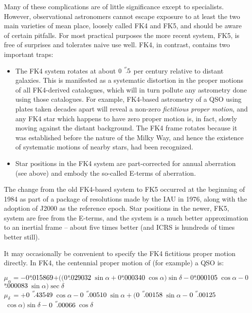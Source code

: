 \documentclass[11pt,twoside,nolof]{starlink}
\providecommand{\arcsec}[2] {\arcseci{#1}$\hspace{-0.4em}.#2$}
\providecommand{\arcseci}[1] {$#1\hspace{-0.05em}$\raisebox{-0.5ex}
                         {$^{'\hspace{-0.1em}'}$}}
\providecommand{\tseci}[1]   {$#1$\mbox{$^{\rm s}$}}
\providecommand{\tsec}[2]    {\tseci{#1}$\hspace{-0.3em}.#2$}
\begin{document}
Many of these complications are of little significance except to
specialists.  However, observational astronomers cannot
escape exposure to at least the two main varieties of
mean place, loosely called
FK4 and FK5, and should be aware of
certain pitfalls.  For most practical purposes the more recent
system, FK5, is free of surprises and tolerates naive
use well.  FK4, in contrast, contains two important traps:
\begin{itemize}
\item The FK4 system rotates at about
      \arcsec{0}{5} per century relative to distant galaxies.
      This is manifested as a systematic distortion in the
      proper motions of all FK4-derived catalogues, which will
      in turn pollute any astrometry done using those catalogues.
      For example, FK4-based astrometry of a QSO using plates
      taken decades apart will reveal a non-zero \textit{fictitious proper
      motion}, and any FK4 star which happens to have zero proper
      motion is, in fact, slowly moving against the distant
      background.  The FK4 frame rotates because it was
      established before the nature of the Milky Way, and hence the
      existence of systematic motions of nearby stars, had been
      recognized.
\item Star positions in the FK4 system are part-corrected for
      annual aberration (see above) and embody the so-called
      E-terms of aberration.
\end{itemize}
The change from the old FK4-based system to FK5
occurred at the beginning
of 1984 as part of a package of resolutions made by the IAU in 1976,
along with the adoption of J2000 as the reference epoch.  Star
positions in the newer, FK5, system are free from the E-terms, and
the system is a much better approximation to an
inertial frame -- about five times better (and ICRS is hundreds
of times better still).

It may occasionally be convenient to specify the FK4 fictitious proper
motion directly.  In FK4, the centennial proper motion of (for example)
a QSO is:

$\mu_\alpha=-$\tsec{0}{015869}$
          +(($\tsec{0}{029032}$~\sin \alpha
            +$\tsec{0}{000340}$~\cos \alpha ) \sin \delta
            -$\tsec{0}{000105}$~\cos \alpha
            -$\tsec{0}{000083}$~\sin \alpha ) \sec \delta $ \\
$\mu_\delta\,=+$\arcsec{0}{43549}$~\cos \alpha
              -$\arcsec{0}{00510}$~\sin \alpha +
              ($\arcsec{0}{00158}$~\sin \alpha
              -$\arcsec{0}{00125}$~\cos \alpha ) \sin \delta
              -$\arcsec{0}{00066}$~\cos \delta $
\end{document}
